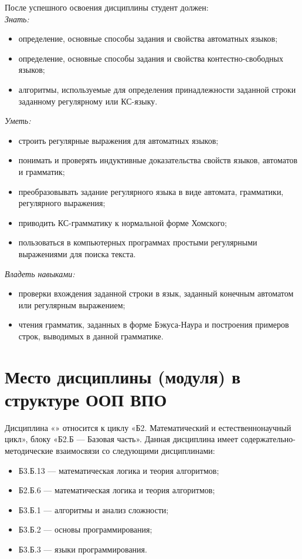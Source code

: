 \documentclass{rpd}
\begin{document}
    \bigskip
    После успешного освоения дисциплины студент должен:\\
    \emph{Знать:}
    \begin{itemize}
        \item 
        определение, основные способы задания и свойства автоматных языков;
        \item 
        определение, основные способы задания и свойства контестно-свободных языков;
        \item
        алгоритмы, используемые для определения принадлежности заданной строки заданному регулярному или КС-языку.
    \end{itemize}
    \emph{Уметь:}
    \begin{itemize}
        \item 
        строить регулярные выражения для автоматных языков;
        \item 
        понимать и проверять индуктивные доказательства свойств языков, автоматов и грамматик;
        \item
        преобразовывать задание регулярного языка в виде автомата, грамматики, регулярного выражения;
        \item
        приводить КС-грамматику к нормальной форме Хомского;
        \item
        пользоваться в компьютерных программах простыми регулярными выражениями для поиска текста.
    \end{itemize}
    \emph{Владеть навыками:} 
    \begin{itemize}
        \item 
        проверки вхождения заданной строки в язык, заданный конечным автоматом или регулярным выражением; 
        \item 
        чтения грамматик, заданных в форме Бэкуса-Наура и построения примеров строк, выводимых в данной грамматике.
    \end{itemize}   


\section{Место дисциплины (модуля) в структуре ООП ВПО}

    Дисциплина «\@discipline» относится к циклу «Б2. Математический и естественнонаучный цикл», блоку «Б2.Б — Базовая часть».  Данная дисциплина имеет содержательно-методические взаимосвязи со следующими дисциплинами:
    \begin{itemize}
    \item Б3.Б.13 --- математическая логика и теория алгоритмов;
    \item Б2.Б.6 --- математическая логика и теория алгоритмов;
    \item Б3.Б.1 --- алгоритмы и анализ сложности;
    \item Б3.Б.2 --- основы программирования;
    \item Б3.Б.3 --- языки программирования.
    \end{itemize}
\end{document}
